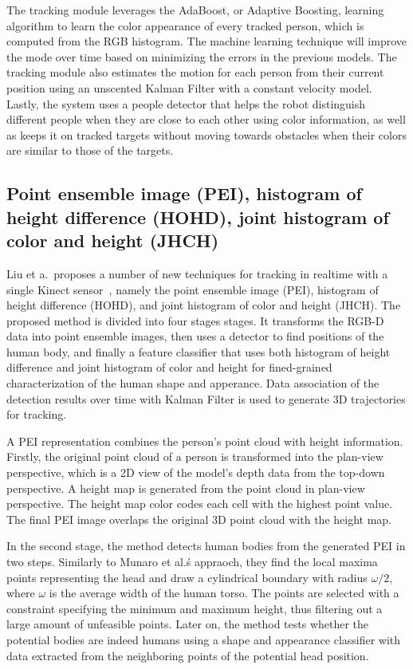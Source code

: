 The tracking module leverages the AdaBoost, or Adaptive Boosting, learning algorithm to learn the color appearance of every tracked person, which is computed from the RGB histogram. The machine learning technique will improve the mode over time based on minimizing the errors in the previous models. The tracking module also estimates the motion for each person from their current position using an unscented Kalman Filter with a constant velocity model. Lastly, the system uses a people detector that helps the robot distinguish different people when they are close to each other using color information, as well as keeps it on tracked targets without moving towards obstacles when their colors are similar to those of the targets.

\subsection{Point ensemble image (PEI), histogram of height difference (HOHD), joint histogram of color and height (JHCH)}

Liu et a.\ proposes a number of new techniques for tracking in realtime with a single Kinect sensor~\cite{liu_tracking_with_pei}, namely the point ensemble image (PEI), histogram of height difference (HOHD), and joint histogram of color and height (JHCH). The proposed method is divided into four stages stages. It transforms the RGB-D data into point ensemble images, then uses a detector to find positions of the human body, and finally a feature classifier that uses both histogram of height difference and joint histogram of color and height for fined-grained characterization of the human shape and apperance. Data association of the detection results over time with Kalman Filter is used to generate 3D trajectories for tracking.

A PEI representation combines the person's point cloud with height information. Firstly, the original point cloud of a person is transformed into the plan-view perspective, which is a 2D view of the model's depth data from the top-down perspective. A height map is generated from the point cloud in plan-view perspective. The height map color codes each cell with the highest point value. The final PEI image overlaps the original 3D point cloud with the height map.

In the second stage, the method detects human bodies from the generated PEI in two steps. Similarly to Munaro et al.\'s appraoch, they find the local maxima points representing the head and draw a cylindrical boundary with radius $\omega/2$, where $\omega$ is the average width of the human torso. The points are selected with a constraint specifying the minimum and maximum height, thus filtering out a large amount of unfeasible points. Later on, the method tests whether the potential bodies are indeed humans using a shape and appearance classifier with data extracted from the neighboring points of the potential head position.

